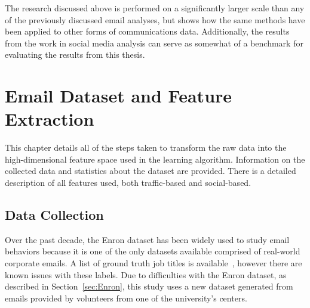\documentclass[12pt]{report}
\begin{document}
The research discussed above is performed on a significantly larger scale than any of the previously discussed email analyses, but shows how the same methods have been applied to other forms of communications data.
Additionally, the results from the work in social media analysis can serve as somewhat of a benchmark for evaluating the results from this thesis.

\chapter{Email Dataset and Feature Extraction} \label{Data}
This chapter details all of the steps taken to transform the raw data into the high-dimensional feature space used in the learning algorithm.
Information on the collected data and statistics about the dataset are provided.
There is a detailed description of all features used, both traffic-based and social-based.

\section{Data Collection}
Over the past decade, the Enron dataset has been widely used to study email behaviors because it is one of the only datasets available comprised of real-world corporate emails.
A list of ground truth job titles is available~\cite{shetty_status_2004}, however there are known issues with these labels.
Due to difficulties with the Enron dataset, as described in Section~\ref{sec:Enron}, this study uses a new dataset generated from emails provided by volunteers from one of the university's centers.
\end{document}
